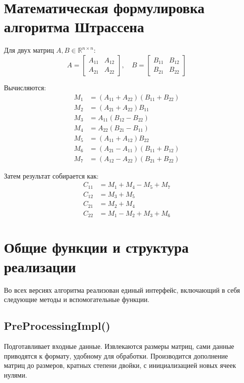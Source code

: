 \documentclass[12pt]{article}
\begin{document}
\section{Математическая формулировка алгоритма Штрассена}
Для двух матриц $A, B \in \mathbb{R}^{n \times n}$:
\[
A = \begin{bmatrix} A_{11} & A_{12} \\ A_{21} & A_{22} \end{bmatrix}, \quad
B = \begin{bmatrix} B_{11} & B_{12} \\ B_{21} & B_{22} \end{bmatrix}
\]

Вычисляются:
\begin{align*}
M_1 &= (A_{11} + A_{22})(B_{11} + B_{22}) \\
M_2 &= (A_{21} + A_{22})B_{11} \\
M_3 &= A_{11}(B_{12} - B_{22}) \\
M_4 &= A_{22}(B_{21} - B_{11}) \\
M_5 &= (A_{11} + A_{12})B_{22} \\
M_6 &= (A_{21} - A_{11})(B_{11} + B_{12}) \\
M_7 &= (A_{12} - A_{22})(B_{21} + B_{22})
\end{align*}

Затем результат собирается как:
\begin{align*}
C_{11} &= M_1 + M_4 - M_5 + M_7 \\
C_{12} &= M_3 + M_5 \\
C_{21} &= M_2 + M_4 \\
C_{22} &= M_1 - M_2 + M_3 + M_6
\end{align*}

\section{Общие функции и структура реализации}
Во всех версиях алгоритма реализован единый интерфейс, включающий в себя следующие методы и вспомогательные функции.

\subsection*{PreProcessingImpl()}
Подготавливает входные данные. Извлекаются размеры матриц, сами данные приводятся к формату, удобному для обработки. Производится дополнение матриц до размеров, кратных степени двойки, с инициализацией новых ячеек нулями.
\end{document}
